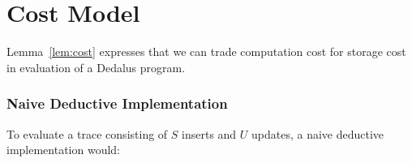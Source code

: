 \section{Cost Model}

Lemma~\ref{lem:cost} expresses that we can trade computation cost for storage 
cost in evaluation of a Dedalus program. 




\subsubsection{Naive Deductive Implementation}

To evaluate a trace consisting of $S$ inserts and $U$ updates, a naive
deductive implementation would:

